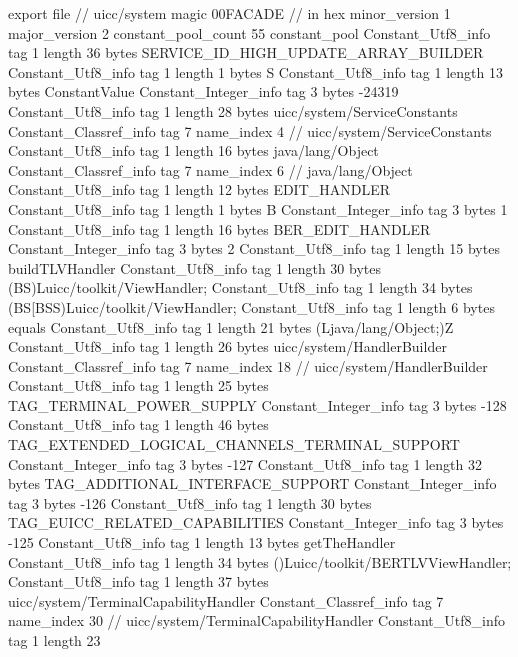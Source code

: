 export file {		// uicc/system
	magic	00FACADE		 // in hex
	minor_version	1
	major_version	2
	constant_pool_count	55
	constant_pool {
		Constant_Utf8_info {
			tag	1
			length	36
			bytes	SERVICE_ID_HIGH_UPDATE_ARRAY_BUILDER
		}
		Constant_Utf8_info {
			tag	1
			length	1
			bytes	S
		}
		Constant_Utf8_info {
			tag	1
			length	13
			bytes	ConstantValue
		}
		Constant_Integer_info {
			tag	3
			bytes	-24319
		}
		Constant_Utf8_info {
			tag	1
			length	28
			bytes	uicc/system/ServiceConstants
		}
		Constant_Classref_info {
			tag	7
			name_index	4		// uicc/system/ServiceConstants
		}
		Constant_Utf8_info {
			tag	1
			length	16
			bytes	java/lang/Object
		}
		Constant_Classref_info {
			tag	7
			name_index	6		// java/lang/Object
		}
		Constant_Utf8_info {
			tag	1
			length	12
			bytes	EDIT_HANDLER
		}
		Constant_Utf8_info {
			tag	1
			length	1
			bytes	B
		}
		Constant_Integer_info {
			tag	3
			bytes	1
		}
		Constant_Utf8_info {
			tag	1
			length	16
			bytes	BER_EDIT_HANDLER
		}
		Constant_Integer_info {
			tag	3
			bytes	2
		}
		Constant_Utf8_info {
			tag	1
			length	15
			bytes	buildTLVHandler
		}
		Constant_Utf8_info {
			tag	1
			length	30
			bytes	(BS)Luicc/toolkit/ViewHandler;
		}
		Constant_Utf8_info {
			tag	1
			length	34
			bytes	(BS[BSS)Luicc/toolkit/ViewHandler;
		}
		Constant_Utf8_info {
			tag	1
			length	6
			bytes	equals
		}
		Constant_Utf8_info {
			tag	1
			length	21
			bytes	(Ljava/lang/Object;)Z
		}
		Constant_Utf8_info {
			tag	1
			length	26
			bytes	uicc/system/HandlerBuilder
		}
		Constant_Classref_info {
			tag	7
			name_index	18		// uicc/system/HandlerBuilder
		}
		Constant_Utf8_info {
			tag	1
			length	25
			bytes	TAG_TERMINAL_POWER_SUPPLY
		}
		Constant_Integer_info {
			tag	3
			bytes	-128
		}
		Constant_Utf8_info {
			tag	1
			length	46
			bytes	TAG_EXTENDED_LOGICAL_CHANNELS_TERMINAL_SUPPORT
		}
		Constant_Integer_info {
			tag	3
			bytes	-127
		}
		Constant_Utf8_info {
			tag	1
			length	32
			bytes	TAG_ADDITIONAL_INTERFACE_SUPPORT
		}
		Constant_Integer_info {
			tag	3
			bytes	-126
		}
		Constant_Utf8_info {
			tag	1
			length	30
			bytes	TAG_EUICC_RELATED_CAPABILITIES
		}
		Constant_Integer_info {
			tag	3
			bytes	-125
		}
		Constant_Utf8_info {
			tag	1
			length	13
			bytes	getTheHandler
		}
		Constant_Utf8_info {
			tag	1
			length	34
			bytes	()Luicc/toolkit/BERTLVViewHandler;
		}
		Constant_Utf8_info {
			tag	1
			length	37
			bytes	uicc/system/TerminalCapabilityHandler
		}
		Constant_Classref_info {
			tag	7
			name_index	30		// uicc/system/TerminalCapabilityHandler
		}
		Constant_Utf8_info {
			tag	1
			length	23
}}}
